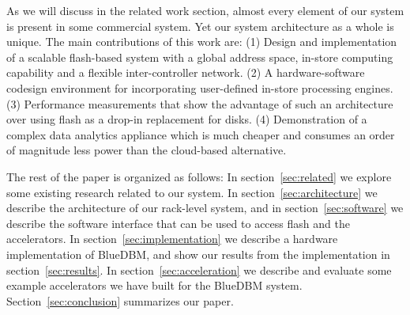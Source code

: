 As we will discuss in the related work section, almost every element of our
system is present in some commercial system. Yet our system architecture as a
whole is unique.  The main contributions of this work are: (1) Design and
implementation of a scalable flash-based system with a global address space,
in-store computing capability and a flexible inter-controller network. (2) A
hardware-software codesign environment for incorporating user-defined in-store
processing engines. (3) Performance measurements that show the advantage of such
an architecture over using flash as a drop-in replacement for disks. (4)
Demonstration of a complex data analytics appliance which is much cheaper and
consumes an order of magnitude less power than the cloud-based alternative.

The rest of the paper is organized as follows: In section~\ref{sec:related} we
explore some existing research related to our system. In
section~\ref{sec:architecture} we describe the architecture of our rack-level
system, and in section~\ref{sec:software} we describe the software interface
that can be used to access flash and the accelerators. In
section~\ref{sec:implementation} we describe a hardware implementation of
BlueDBM, and show our results from the implementation in
section~\ref{sec:results}.  In section~\ref{sec:acceleration} we describe and
evaluate some example accelerators we have built for the BlueDBM system. 
Section~\ref{sec:conclusion} summarizes our paper.



